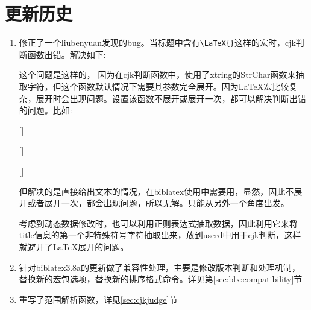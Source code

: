 \section{更新历史}
\label{up:171121}
\begin{enumerate}
\item 修正了一个liubenyuan发现的bug。当标题中含有\verb|\LaTeX{}|这样的宏时，cjk判断函数出错。解决如下:
    \begin{texlist}
    这个问题是这样的，
    因为在cjk判断函数中，使用了xtring的StrChar函数来抽取字符，但这个函数默认情况下需要其参数完全展开。因为\LaTeX{}宏比较复杂，展开时会出现问题。设置该函数不展开或展开一次，都可以解决判断出错的问题。比如:

    \expandarg
    [\tempa]%
    \tempa

    [\tempa]%
    \tempa

    [\tempa]%
    \tempa

    但解决的是直接给出文本的情况，在biblatex使用中需要用，显然，因此不展开或者展开一次，都会出现问题，所以无解。只能从另外一个角度出发。

    考虑到动态数据修改时，也可以利用正则表达式抽取数据，因此利用它来将title信息的第一个非特殊符号字符抽取出来，放到userd中用于cjk判断，这样就避开了\LaTeX{}展开的问题。
    \end{texlist}

\item 针对biblatex3.8a的更新做了兼容性处理，主要是修改版本判断和处理机制，替换新的宏包选项，替换新的排序格式命令。详见第\ref{sec:blx:compatibility}节

\item 重写了范围解析函数，详见\ref{sec:cjkjudge}节

\end{enumerate}

